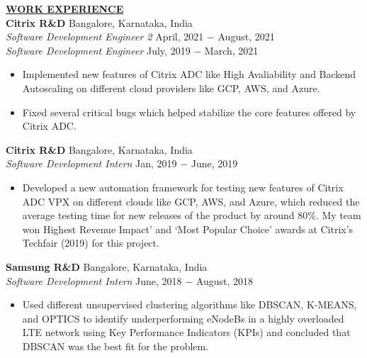 \documentclass{article}
\begin{document}
% 
%
\noindent \textbf{\underline{WORK EXPERIENCE}} \\
\noindent \textbf{Citrix R\&D} \hfill Bangalore, Karnataka, India \\
\textit{Software Development Engineer 2} \hfill April, 2021 $-$ August, 2021 \\
\textit{Software Development Engineer} \hfill July, 2019 $-$ March, 2021 
\begin{itemize}[noitemsep,nolistsep,leftmargin=*]
\item {Implemented new features of Citrix ADC like High Avaliability and Backend Autoscaling on different cloud providers like GCP, AWS, and Azure.}
\item {Fixed several critical bugs which helped stabilize the core features offered by Citrix ADC. \\}
\end{itemize}

\noindent \textbf{Citrix R\&D} \hfill Bangalore, Karnataka, India \\
\textit{Software Development Intern} \hfill Jan, 2019 $-$ June, 2019
\begin{itemize}[noitemsep,nolistsep,leftmargin=*]
\item {Developed a new automation framework for testing new features of Citrix ADC VPX on different clouds like GCP, AWS, and Azure, which reduced the average testing time for new releases of the product by around 80\%. My team won Highest Revenue Impact’ and ‘Most Popular Choice’ awards at Citrix's Techfair (2019) for this project.\\}
\end{itemize}

\noindent \textbf{Samsung R\&D} \hfill Bangalore, Karnataka, India \\
\textit{Software Development Intern} \hfill June, 2018 $-$ August, 2018
\begin{itemize}[noitemsep,nolistsep,leftmargin=*]
\item {Used different unsupervised clustering algorithms like DBSCAN, K-MEANS, and OPTICS to identify underperforming eNodeBs in a highly overloaded LTE network using Key Performance Indicators (KPIs) and concluded that DBSCAN was the best fit for the problem. \\}
\end{itemize}
\end{document}
